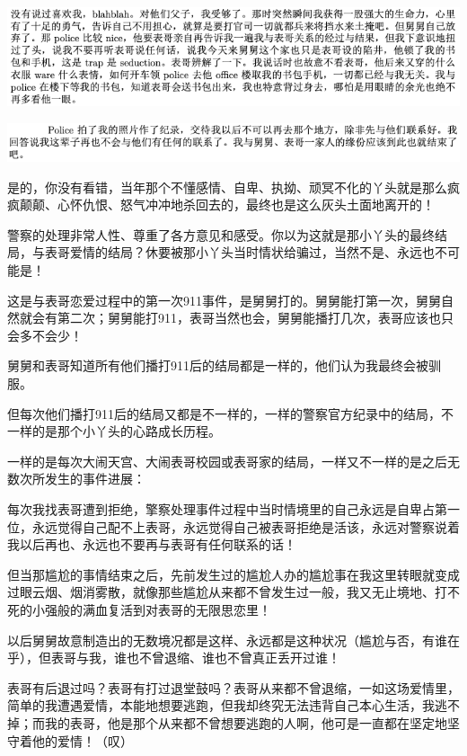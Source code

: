 \documentclass[9pt, b5paper]{article}
\begin{document}
\begin{center}
\includegraphics[width=.9\linewidth]{./pic/p1p68-5.png}
\end{center}

\begin{center}
\includegraphics[width=.9\linewidth]{./pic/p1p68-6.png}
\end{center}

是的，你没有看错，当年那个不懂感情、自卑、执拗、顽冥不化的丫头就是那么疯疯颠颠、心怀仇恨、怒气冲冲地杀回去的，最终也是这么灰头土面地离开的！

警察的处理非常人性、尊重了各方意见和感受。你以为这就是那小丫头的最终结局，与表哥爱情的结局？休要被那小丫头当时情状给骗过，当然不是、永远也不可能是！

这是与表哥恋爱过程中的第一次911事件，是舅舅打的。舅舅能打第一次，舅舅自然就会有第二次；舅舅能打911，表哥当然也会，舅舅能播打几次，表哥应该也只会多不会少！

舅舅和表哥知道所有他们播打911后的结局都是一样的，他们认为我最终会被驯服。

但每次他们播打911后的结局又都是不一样的，一样的警察官方纪录中的结局，不一样的是那个小丫头的心路成长历程。

一样的是每次大闹天宫、大闹表哥校园或表哥家的结局，一样又不一样的是之后无数次所发生的事件进展：

每次我找表哥遭到拒绝，擎察处理事件过程中当时情境里的自己永远是自卑占第一位，永远觉得自己配不上表哥，永远觉得自己被表哥拒绝是活该，永远对警察说着我以后再也、永远也不要再与表哥有任何联系的话！

但当那尴尬的事情结束之后，先前发生过的尴尬人办的尴尬事在我这里转眼就变成过眼云烟、烟消雾散，就像那些尴尬从来都不曾发生过一般，我又无止境地、打不死的小强般的满血复活到对表哥的无限思恋里！

以后舅舅故意制造出的无数境况都是这样、永远都是这种状况（尴尬与否，有谁在乎），但表哥与我，谁也不曾退缩、谁也不曾真正丢开过谁！

表哥有后退过吗？表哥有打过退堂鼓吗？表哥从来都不曾退缩，一如这场爱情里，简单的我遭遇爱情，本能地想要逃跑，但我却终究无法违背自己本心生活，我逃不掉；而我的表哥，他是那个从来都不曾想要逃跑的人啊，他可是一直都在坚定地坚守着他的爱情！（叹）
\end{document}
